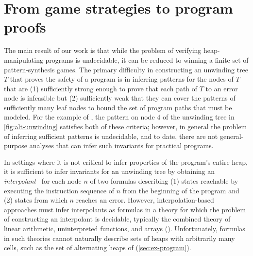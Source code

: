\section{From game strategies to program proofs}
\label{sec:ex-infer}
%
The main result of our work is that while the problem of verifying
heap-manipulating programs is undecidable, it can be reduced to
winning a finite set of pattern-synthesis games.
%
The primary difficulty in constructing an unwinding tree $T$ that
proves the safety of a program is in inferring patterns for the nodes
of $T$ that are (1) sufficiently strong enough to prove that each path
of $T$ to an error node is infeasible but (2) sufficiently weak that
they can cover the patterns of sufficiently many leaf nodes to bound
the set of program paths that must be modeled.
%
For the example of \altlist, the pattern on node $4$ of the unwinding
tree in \autoref{fig:alt-unwinding} satisfies both of these criteria;
%
however, in general the problem of inferring sufficient patterns is
undecidable, and to date, there are not general-purpose analyses that
can infer such invariants for practical programs.

In settings where it is not critical to infer properties of the
program's entire heap, it is sufficient to infer invariants for an
unwinding tree by obtaining an \emph{interpolant}~\cite{mcmillan06}
for each node $n$ of two formulas describing (1) states reachable by
executing the instruction sequence of $n$ from the beginning of the
program and (2) states from which $n$ reaches an error.
%
However, interpolation-based approaches must infer interpolants as
formulas in a theory for which the problem of constructing an
interpolant is decidable, typically the combined theory of linear
arithmetic, uninterpreted functions, and arrays (\liufa).
%
Unfortunately, formulas in such theories cannot naturally describe
sets of heaps with arbitrarily many cells, such as the set of
alternating heaps of \altlist (\autoref{sec:ex-program}).

